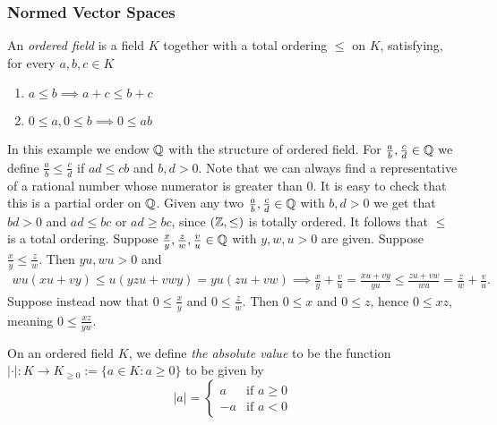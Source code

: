     \subsubsection{Normed Vector Spaces}
        \begin{definition}
            An \textit{ordered field} is a field $K$ together with a total ordering $\leq$ on $K$, satisfying, for every $a,b,c\in K$
            \begin{enumerate}
                \item $a\leq b \implies a+c \leq b+c$
                \item $0\leq a, 0\leq b\implies 0\leq ab$
            \end{enumerate}
        \end{definition}
        \begin{example}
            In this example we endow $\mathbb{Q}$ with the structure of ordered field. For $\frac{a}{b},\frac{c}{d}\in \mathbb{Q}$ we define $\frac{a}{b} \leq \frac{c}{d}$ if $ad\leq cb$ and $b,d>0$. Note that we can always find a representative of a rational number whose numerator is greater than $0$. It is easy to check that this is a partial order on $\mathbb{Q}$. Given any two $\frac{a}{b},\frac{c}{d}\in\mathbb{Q}$ with $b,d>0$ we get that $bd>0$ and $ad\leq bc$ or $ad\geq bc$, since $(\mathbb{Z},\leq)$ is totally ordered. It follows that $\leq$ is a total ordering. Suppose $\frac{x}{y},\frac{z}{w},\frac{v}{u}\in \mathbb{Q}$ with $y,w,u>0$ are given. Suppose $\frac{x}{y}\leq \frac{z}{w}$. Then $yu,wu>0$ and
            \begin{align*}
                wu(xu+vy) \leq u(yzu+vwy)=yu(zu+vw) \implies \frac{x}{y}+\frac{v}{u}=\frac{xu+vy}{yu} \leq \frac{zu+vw}{wu}=\frac{z}{w}+\frac{v}{u}.
            \end{align*}
            Suppose instead now that $0\leq \frac{x}{y}$ and $0\leq \frac{z}{w}$.  Then $0\leq x$ and $0\leq z$, hence $0\leq xz$, meaning $0\leq \frac{xz}{yw}$.
        \end{example}
        \begin{definition}
            On an ordered field $K$, we define \textit{the absolute value} to be the function $\vert \cdot \vert : K \rightarrow K_{\geq 0} :=\{a\in K : a\geq 0\}$ to be given by 
            $$\vert a \vert = \begin{cases}
                a & \text{if } a\geq 0\\
                -a & \text{if } a <0
            \end{cases}$$
        \end{definition}
